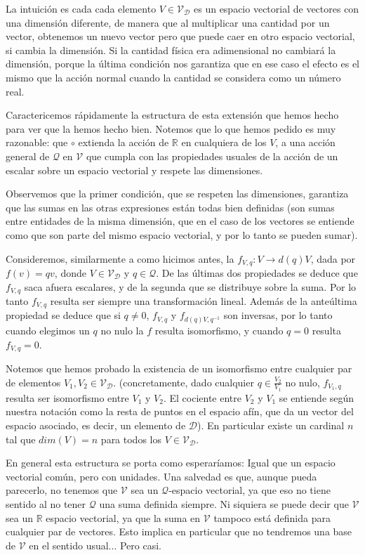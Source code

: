 \documentclass{article}
\def\Dimensions{\mathcal D}
\def\Quantities{\mathcal Q}
\begin{document}
La intuición es cada cada elemento $V \in \mathcal{V_D}$ es un espacio vectorial de vectores con una dimensión diferente,
de manera que al multiplicar una cantidad por un vector, obtenemos un nuevo vector pero que puede caer en otro espacio
vectorial, si cambia la dimensión. Si la cantidad física era adimensional no cambiará la dimensión, porque la última
condición nos garantiza que en ese caso el efecto es el mismo que la acción normal cuando la cantidad se considera como
un número real.

Caractericemos rápidamente la estructura de esta extensión que hemos hecho para ver que la hemos hecho bien.
Notemos que lo que hemos pedido es muy razonable: que $\circ$ extienda la acción de $\mathbb{R}$ en cualquiera de los $V$, a una
acción general de $\Quantities$ en $\mathcal{V}$ que cumpla con las propiedades usuales de la acción de un escalar sobre un espacio
vectorial y respete las dimensiones.

Observemos que la primer condición, que se respeten las dimensiones, garantiza que las sumas en las otras expresiones están todas
bien definidas (son sumas entre entidades de la misma dimensión, que en el caso de los vectores se entiende como que son parte del mismo
espacio vectorial, y por lo tanto se pueden sumar).

Consideremos, similarmente a como hicimos antes, la $f_{V,q} : V \rightarrow d(q) V$, dada por 
$f(v) = qv$, donde $V \in \mathcal{V_D}$ y $q \in \Quantities$. De las últimas dos propiedades se
deduce que $f_{V,q}$ saca afuera escalares, y de la segunda que se distribuye sobre la suma. Por lo
tanto $f_{V,q}$ resulta ser siempre una transformación lineal. Además de la anteúltima propiedad se
deduce que si $q \neq 0$, $f_{V,q}$ y $f_{d(q) V, q^{-1}}$ son inversas, por lo tanto cuando elegimos
un $q$ no nulo la $f$ resulta isomorfismo, y cuando $q = 0$ resulta $f_{V,q} = 0$.

Notemos que hemos probado la existencia de un isomorfismo entre cualquier par de elementos $V_1, V_2 \in \mathcal{V_D}$.
(concretamente, dado cualquier $q \in \frac{V_2}{V_1}$ no nulo, $f_{V_1, q}$ resulta ser isomorfismo entre $V_1$ y $V_2$.
El cociente entre $V_2$ y $V_1$ se entiende según nuestra notación como la resta de puntos en el espacio afín, que da
un vector del espacio asociado, es decir, un elemento de $\Dimensions$).
En particular existe un cardinal $n$ tal que $dim(V) = n$ para todos los $V \in \mathcal{V_D}$.

En general esta estructura se porta como esperaríamos: Igual que un espacio vectorial común, pero con unidades. Una salvedad
es que, aunque pueda parecerlo, no tenemos que $\mathcal{V}$ sea un $\Quantities$-espacio vectorial, ya que eso no tiene sentido
al no tener $\Quantities$ una suma definida siempre. Ni siquiera se puede decir que $\mathcal{V}$ sea un $\mathbb{R}$ espacio vectorial,
ya que la suma en $\mathcal{V}$ tampoco está definida para cualquier par de vectores. Esto implica en particular que no tendremos
una base de $\mathcal{V}$ en el sentido usual... Pero casi.
\end{document}
